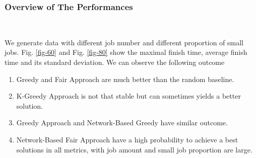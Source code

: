 \subsubsection{Overview of The Performances}
~




We generate data with different job number and different proportion of small jobs. Fig. \ref{fig-60} and Fig. \ref{fig-80} show the maximal finish time, average finish time and its standard deviation.
We can observe the following outcome 
\begin{enumerate}
    \item Greedy and Fair Approach are much better than the random baseline. 
    \item K-Greedy Approach is not that stable but can sometimes yields a better solution.
    \item Greedy Approach and Network-Based Greedy have similar outcome.
    \item Network-Based Fair Approach have a high probability to achieve a best solutions in all metrics, with job amount and small job proportion are large.
\end{enumerate}